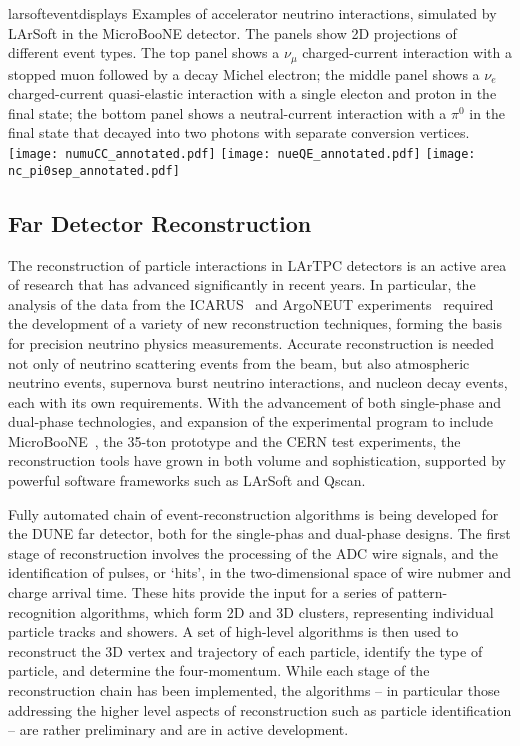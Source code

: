 \begin{cdrfigure}{larsofteventdisplays}
{Examples of accelerator neutrino interactions, simulated by LArSoft in the 
MicroBooNE detector. The panels show 2D projections of different event types.
The top panel shows a $\nu_{\mu}$ charged-current interaction with a stopped muon followed
by a decay Michel electron; the middle panel shows a $\nu_{e}$ charged-current 
quasi-elastic interaction with a single electon and proton in the final state;
the bottom panel shows a neutral-current interaction with a $\pi^{0}$ in the final state
that decayed into two photons with separate conversion vertices.}
\texttt{[image: numuCC\_annotated.pdf]}
\texttt{[image: nueQE\_annotated.pdf]}
\texttt{[image: nc\_pi0sep\_annotated.pdf]}
\end{cdrfigure}

\subsection{Far Detector Reconstruction}
\label{sec:detectors-sc-physics-software-reconstruction-fd}

The reconstruction of particle interactions in LArTPC
detectors is an active area of research that has advanced significantly in recent years.
In particular, the analysis of the data from the ICARUS~\cite{Amerio:2004ze,icarus-url,ICARUS-pizero,Antonello:2012hu} 
and ArgoNEUT experiments~\cite{Adamson:2013/02/28tla,argoneut-url,Acciarri:2013met}
required the development of a variety of new reconstruction techniques,
forming the basis for precision neutrino physics measurements.
Accurate reconstruction is needed not only of neutrino scattering events from the beam, but also atmospheric neutrino events,
supernova burst neutrino interactions, and nucleon decay events, each with its own requirements.
With the advancement of both single-phase and dual-phase technologies,
and expansion of the experimental program to include MicroBooNE~\cite{Chen:2007ae,microboone-url},
the 35-ton prototype and the CERN test experiments,
the reconstruction tools have grown in both volume and sophistication,
supported by powerful software frameworks such as LArSoft and Qscan.

Fully automated chain of event-reconstruction algorithms
is being developed for the DUNE far detector, both for the single-phas and dual-phase designs.
The first stage of reconstruction involves the processing of the
ADC wire signals, and the identification of pulses, or `hits', in the 
two-dimensional space of wire nubmer and charge arrival time. 
These hits provide the input for a series of pattern-recognition algorithms,
which form 2D and 3D clusters, representing individual particle tracks and showers.
A set of high-level algorithms is then used to reconstruct the 
3D vertex and trajectory of each particle, identify the type of particle, and determine the four-momentum.
While each stage of the reconstruction chain has been implemented, the algorithms -- in
particular those addressing the higher level aspects of reconstruction such as particle identification -- are
rather preliminary and are in active development.


